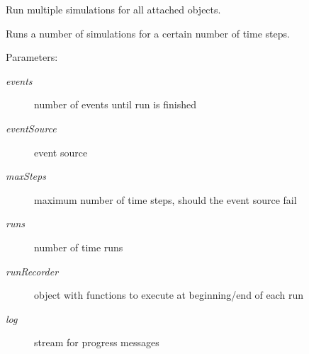 Run multiple simulations for all attached objects. 

Runs a number of simulations for a certain number of time steps. \begin{Desc}
\item[Parameters: ]\par
\begin{description}
\item[{\em 
events}]number of events until run is finished \item[{\em 
eventSource}]event source \item[{\em 
maxSteps}]maximum number of time steps, should the event source fail \item[{\em 
runs}]number of time runs \item[{\em 
runRecorder}]object with functions to execute at beginning/end of each run \item[{\em 
log}]stream for progress messages \end{description}
\end{Desc}

